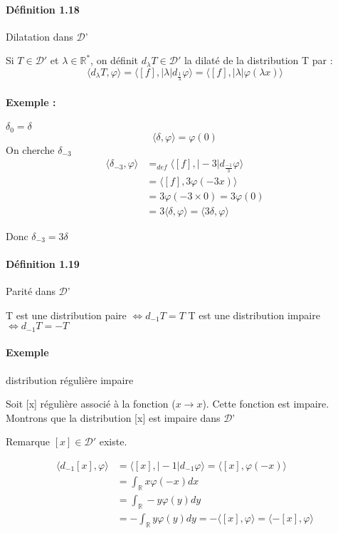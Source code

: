 \documentclass[12pt,a4paper]{report}
\newcommand{\ens}[1]{\ensuremath{\mathbb{#1}}}
\newcommand{\D}{\ensuremath{\mathcal{D}}}
\begin{document}
\paragraph{Définition 1.18} Dilatation dans \D'

Si \(T \in \D'\) et \(\lambda \in \ens{R^*}\), on définit \(d_\lambda T \in \D'\) la dilaté de la distribution T par :
\[
	\langle d_\lambda T, \varphi \rangle = \langle [f], \vert \lambda \vert d_{\frac{1}{\lambda}} \varphi \rangle = \langle [f], \vert \lambda \vert \varphi (\lambda x) \rangle 
\]

\paragraph{Exemple : } \(\delta_0 = \delta\)
\[
	\langle \delta, \varphi \rangle = \varphi(0)
\]
On cherche \(\delta_{-3}\)
\begin{align*}
	\langle \delta_{-3}, \varphi \rangle &=_{def} \langle [f], \vert -3 \vert d_{\frac{-1}{3}} \varphi \rangle\\
	&= \langle [f], 3 \varphi(-3x) \rangle\\
	&= 3 \varphi (-3 \times 0) = 3 \varphi (0)\\
	&= 3 \langle \delta, \varphi \rangle = \langle 3\delta, \varphi \rangle 
\end{align*}

Donc \(\delta_{-3} = 3\delta\) 

\paragraph{Définition 1.19} Parité dans \D'

T est une distribution paire \(\Leftrightarrow d_{-1} T = T\)
T est une distribution impaire \(\Leftrightarrow d_{-1} T = -T\)

\paragraph{Exemple} distribution régulière impaire

Soit [x] régulière associé à la fonction (\(x \rightarrow x\)). Cette fonction est impaire. Montrons que la distribution [x] est impaire dans \D'

Remarque \([x] \in \D'\) existe.

\begin{align*}
	\langle d_{-1} [x], \varphi \rangle &= \langle [x],\vert -1 \vert d_{-1} \varphi \rangle = \langle [x], \varphi(-x) \rangle\\
	&= \int_{\ens{R}} x \varphi(-x) dx\\
	&= \int_{\ens{R}} -y \varphi(y) dy\\
	&= - \int_{\ens{R}} y \varphi(y) dy = - \langle [x], \varphi \rangle = \langle -[x], \varphi \rangle\\
\end{align*}
\end{document}
